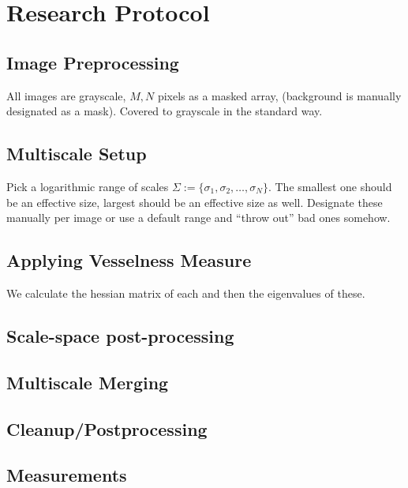 \chapter{Research Protocol}


\section{Image Preprocessing}
	All images are grayscale, $M,N$ pixels as a masked array, (background is manually designated as a mask).
	Covered to grayscale in the standard way.
\section{Multiscale Setup}
	Pick a logarithmic range of scales $\Sigma := \{ \sigma_1, \sigma_2, \dots, \sigma_N\}$.
	The smallest one should be an effective size, largest should be an effective size as well. Designate these manually per image or use a default range and ``throw out'' bad ones somehow.
	
\section{Applying Vesselness Measure}
We calculate the hessian matrix of each and then the eigenvalues of these.

\section{Scale-space post-processing}
\section{Multiscale Merging}
\section{Cleanup/Postprocessing}
\section{Measurements}
